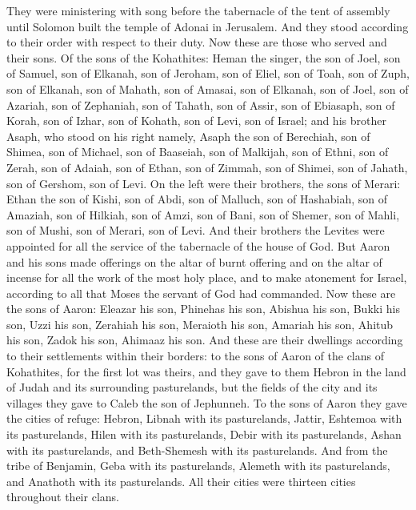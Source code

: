 \begin{biblechapter}
\verse They were ministering with song before the tabernacle of the tent of assembly until Solomon built the temple of Adonai in Jerusalem. And they stood according to their order with respect to their duty.
\verse Now these are those who served and their sons. Of the sons of the Kohathites: Heman the singer, the son of Joel, son of Samuel,
\verse son of Elkanah, son of Jeroham, son of Eliel, son of Toah,
\verse son of Zuph, son of Elkanah, son of Mahath, son of Amasai,
\verse son of Elkanah, son of Joel, son of Azariah, son of Zephaniah,
\verse son of Tahath, son of Assir, son of Ebiasaph, son of Korah,
\verse son of Izhar, son of Kohath, son of Levi, son of Israel;
\verse and his brother Asaph, who stood on his right namely, Asaph the son of Berechiah, son of Shimea,
\verse son of Michael, son of Baaseiah, son of Malkijah,
\verse son of Ethni, son of Zerah, son of Adaiah,
\verse son of Ethan, son of Zimmah, son of Shimei,
\verse son of Jahath, son of Gershom, son of Levi.
\verse On the left were their brothers, the sons of Merari: Ethan the son of Kishi, son of Abdi, son of Malluch,
\verse son of Hashabiah, son of Amaziah, son of Hilkiah,
\verse son of Amzi, son of Bani, son of Shemer,
\verse son of Mahli, son of Mushi, son of Merari, son of Levi.
\verse And their brothers the Levites were appointed for all the service of the tabernacle of the house of God.
\verse But Aaron and his sons made offerings on the altar of burnt offering and on the altar of incense for all the work of the most holy place, and to make atonement for Israel, according to all that Moses the servant of God had commanded.
 Now these are the sons of Aaron: Eleazar his son, Phinehas his son, Abishua his son,
\verse Bukki his son, Uzzi his son, Zerahiah his son,
\verse Meraioth his son, Amariah his son, Ahitub his son,
\verse Zadok his son, Ahimaaz his son.
\verse And these are their dwellings according to their settlements within their borders: to the sons of Aaron of the clans of Kohathites, for the first lot was theirs,
\verse and they gave to them Hebron in the land of Judah and its surrounding pasturelands,
\verse but the fields of the city and its villages they gave to Caleb the son of Jephunneh.
\verse To the sons of Aaron they gave the cities of refuge: Hebron, Libnah with its pasturelands, Jattir, Eshtemoa with its pasturelands,
\verse Hilen with its pasturelands, Debir with its pasturelands,
\verse Ashan with its pasturelands, and Beth-Shemesh with its pasturelands.
\verse And from the tribe of Benjamin, Geba with its pasturelands, Alemeth with its pasturelands, and Anathoth with its pasturelands. All their cities were thirteen cities throughout their clans.

\end{biblechapter}
